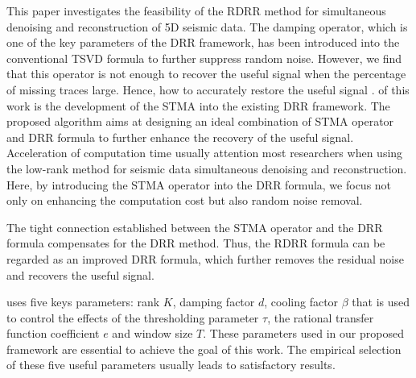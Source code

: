This paper investigates the feasibility of the RDRR method for simultaneous denoising and reconstruction of 5D seismic data. The damping operator, which is one of the key parameters of the DRR framework, has been introduced into the conventional TSVD formula to further suppress random noise. However, we find that  this operator is not enough to recover the useful signal when the percentage of missing traces   large. Hence, how to accurately restore the useful signal .  of this work is the development of the STMA into the existing DRR framework. The proposed algorithm aims at designing an ideal combination of STMA operator and DRR formula to further enhance the recovery of the useful signal. Acceleration of computation time usually  attention  most researchers when using the low-rank method for seismic data simultaneous denoising and reconstruction. Here, by introducing the STMA operator into the DRR formula, we focus not only on enhancing the computation cost but also  random noise removal.

The tight connection established between the STMA operator and the DRR formula compensates for the DRR method. Thus, the RDRR formula can be regarded as an improved DRR formula, which further removes the residual noise and recovers the useful signal. 

 uses five keys parameters: rank $K$, damping factor $d$, cooling factor $\beta$ that is used to control the effects of the thresholding parameter $\tau$, the rational transfer function coefficient $e$ and window size $T$. These parameters used in our proposed framework are essential to achieve the goal of this work. The empirical selection of these five useful parameters usually leads to satisfactory results. 

